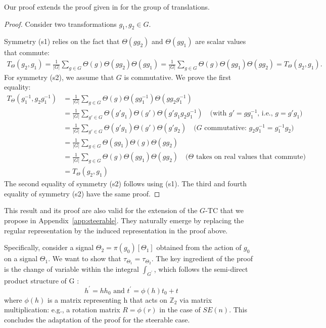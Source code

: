 Our proof extends the proof given in \cite{nikias1993signal} for the group of translations.

\begin{proof}
    Consider two transformations $g_1, g_2 \in G$.

    Symmetry (s1) relies on the fact that $\Theta(gg_2)$ and $\Theta(gg_1)$ are scalar values that commute:
    \begin{align*}
        T_\Theta(g_2, g_1)
            = \frac{1}{|G|} \sum_{g \in G} \Theta(g)\Theta(gg_2)\Theta(gg_1)
            = \frac{1}{|G|} \sum_{g \in G} \Theta(g)\Theta(gg_1)\Theta(gg_2)
            = T_\Theta(g_2, g_1).
    \end{align*}
    For symmetry (s2), we assume that $G$ is commutative.
    We prove the first equality:
    \begin{align*}
        T_\Theta(g^{-1}_1, g_2g^{-1}_1)
            &= \frac{1}{|G|} \sum_{g \in G} \Theta(g)\Theta(gg^{-1}_1)\Theta(gg_2g^{-1}_1) \\
            &= \frac{1}{|G|} \sum_{g' \in G} \Theta(g'g_1)\Theta(g')\Theta(g'g_1g_2g^{-1}_1)
                \quad \text{(with $g' = gg_1^{-1}$, i.e., $g=g'g_1$)} \\
            &= \frac{1}{|G|} \sum_{g' \in G} \Theta(g'g_1)\Theta(g')\Theta(g'g_2)
                \quad \text{($G$ commutative: $g_2 g^{-1}_1 = g^{-1}_1 g_2$)} \\
            &= \frac{1}{|G|} \sum_{g \in G} \Theta(gg_1)\Theta(g)\Theta(gg_2) \\
            &= \frac{1}{|G|} \sum_{g \in G} \Theta(g)\Theta(gg_1)\Theta(gg_2)
                \quad \text{($\Theta$ takes on real values that commute)}\\
            &= T_\Theta(g_2, g_1)
    \end{align*}
    The second equality of symmetry (s2) follows using (s1).
    The third and fourth equality of symmetry (s2) have the same proof.
\end{proof}

This result and its proof are also valid for the extension of the $G$-TC that we propose in Appendix~\ref{app:steerable}. They naturally emerge by replacing the regular representation by the induced representation in the proof above.

Specifically, consider a signal $\Theta_2=\pi\left(g_0\right)[\Theta_1]$ obtained from the action of $g_0$ on a signal $\Theta_1$. We want to show that $\tau_{\Theta_1} = \tau_{\Theta_2}$. The key ingredient of the proof is the change of variable within the integral $\int_{G^{\prime}}$, which follows the semi-direct product structure of $\mathrm{G}$ :
$$
h^{\prime}=h h_0 \text { and } t^{\prime}=\phi(h) t_0+t
$$
where $\phi(h)$ is a matrix representing h that acts on $\mathbb{Z}_2$ via matrix multiplication: e.g., a rotation matrix $R=\phi(r)$ in the case of $SE(n)$. This concludes the adaptation of the proof for the steerable case.



